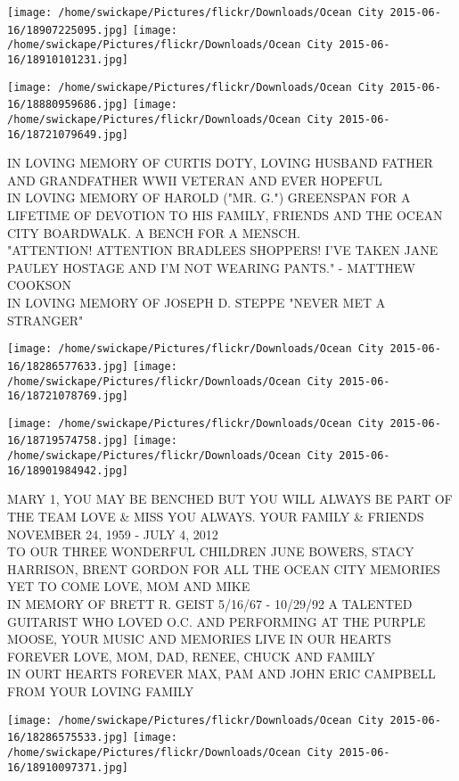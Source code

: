 \documentclass[10pt,letterpaper]{article}
\begin{document}
\texttt{[image: /home/swickape/Pictures/flickr/Downloads/Ocean City 2015-06-16/18907225095.jpg]}
\texttt{[image: /home/swickape/Pictures/flickr/Downloads/Ocean City 2015-06-16/18910101231.jpg]}

\texttt{[image: /home/swickape/Pictures/flickr/Downloads/Ocean City 2015-06-16/18880959686.jpg]}
\texttt{[image: /home/swickape/Pictures/flickr/Downloads/Ocean City 2015-06-16/18721079649.jpg]}

IN LOVING MEMORY OF CURTIS DOTY, LOVING HUSBAND FATHER AND GRANDFATHER WWII VETERAN AND EVER HOPEFUL\\
IN LOVING MEMORY OF HAROLD ("MR. G.") GREENSPAN FOR A LIFETIME OF DEVOTION TO HIS FAMILY, FRIENDS AND THE OCEAN CITY BOARDWALK.  A BENCH FOR A MENSCH.\\
"ATTENTION!  ATTENTION BRADLEES SHOPPERS!  I'VE TAKEN JANE PAULEY HOSTAGE AND I'M NOT WEARING PANTS."  {-} MATTHEW COOKSON\\
IN LOVING MEMORY OF JOSEPH D. STEPPE "NEVER MET A STRANGER"
\pagebreak

\texttt{[image: /home/swickape/Pictures/flickr/Downloads/Ocean City 2015-06-16/18286577633.jpg]}
\texttt{[image: /home/swickape/Pictures/flickr/Downloads/Ocean City 2015-06-16/18721078769.jpg]}

\texttt{[image: /home/swickape/Pictures/flickr/Downloads/Ocean City 2015-06-16/18719574758.jpg]}
\texttt{[image: /home/swickape/Pictures/flickr/Downloads/Ocean City 2015-06-16/18901984942.jpg]}

MARY 1, YOU MAY BE BENCHED BUT YOU WILL ALWAYS BE PART OF THE TEAM LOVE \& MISS YOU ALWAYS.  YOUR FAMILY \& FRIENDS NOVEMBER 24, 1959 {-} JULY 4, 2012\\
TO OUR THREE WONDERFUL CHILDREN JUNE BOWERS, STACY HARRISON, BRENT GORDON FOR ALL THE OCEAN CITY MEMORIES YET TO COME LOVE, MOM AND MIKE\\
IN MEMORY OF BRETT R. GEIST 5/16/67 {-} 10/29/92 A TALENTED GUITARIST WHO LOVED O.C. AND PERFORMING AT THE PURPLE MOOSE, YOUR MUSIC AND MEMORIES LIVE IN OUR HEARTS FOREVER LOVE, MOM, DAD, RENEE, CHUCK AND FAMILY\\
IN OURT HEARTS FOREVER MAX, PAM AND JOHN ERIC CAMPBELL FROM YOUR LOVING FAMILY
\pagebreak

\texttt{[image: /home/swickape/Pictures/flickr/Downloads/Ocean City 2015-06-16/18286575533.jpg]}
\texttt{[image: /home/swickape/Pictures/flickr/Downloads/Ocean City 2015-06-16/18910097371.jpg]}
\end{document}

